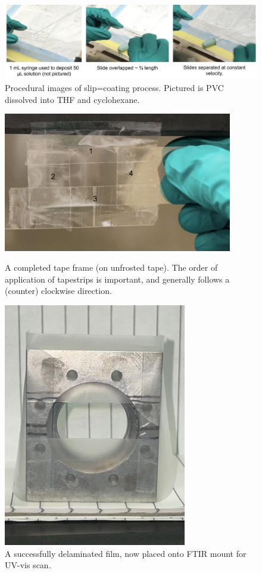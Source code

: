 \documentclass{article}
\begin{document}
\begin{figure}[H]
	\centering
	\captionsetup{width=18cm}
	\includegraphics[width = 18cm]{Slip-Coat-Pic.jpg}
	\caption{Procedural images of slip=coating process. Pictured is PVC dissolved into THF and cyclohexane.}
\end{figure}

\begin{figure}[H]
	\centering
	\begin{minipage}{11.5cm}
		\centering
		\captionsetup{width=10cm}
		\includegraphics[width = 10cm]{IMG_4446.jpeg}
		\caption{A completed tape frame (on unfrosted tape). The order of application of tapestrips is important, and generally follows a (counter) clockwise direction.}
	\end{minipage}%
	\begin{minipage}{8.5cm}
		\centering
		\captionsetup{width=5cm}
		\includegraphics[width = 8cm,angle=270,origin=c]{IMG_4412.jpeg}
		\caption{A successfully delaminated film, now placed onto FTIR mount for UV-vis scan.}
	\end{minipage}
\end{figure}  
\end{document}
